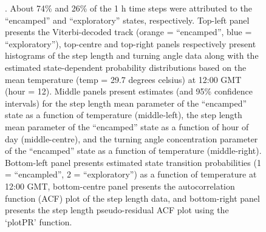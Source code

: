 \documentclass[12pt]{article}\usepackage[]{graphicx}\usepackage[]{color}
\begin{document}
\begin{figure}[htbp]
{. About 74\% and 26\% of the 1 h time steps were attributed to the ``encamped'' and ``exploratory'' states, respectively. Top-left panel presents the Viterbi-decoded track (orange = ``encamped'', blue = ``exploratory''), top-centre and top-right panels respectively present histograms of the step length and turning angle data along with the estimated state-dependent probability distributions based on the mean temperature (temp = 29.7 degrees celsius) at 12:00 GMT (hour = 12).  Middle panels present estimates (and 95\% confidence intervals) for the step length mean parameter of the ``encamped'' state as a function of temperature (middle-left), the step length mean parameter of the ``encamped'' state as a function of hour of day (middle-centre), and the turning angle concentration parameter of the ``encamped'' state as a function of temperature (middle-right).  Bottom-left panel presents estimated state transition probabilities (1 = ``encampled'', 2 = ``exploratory'') as a function of temperature at 12:00 GMT, bottom-centre panel presents the autocorrelation function (ACF) plot of the step length data, and bottom-right panel presents the step length pseudo-residual ACF plot using the `plotPR' function.}
  \label{fig:elephantResults}
\end{figure}
\end{document}

